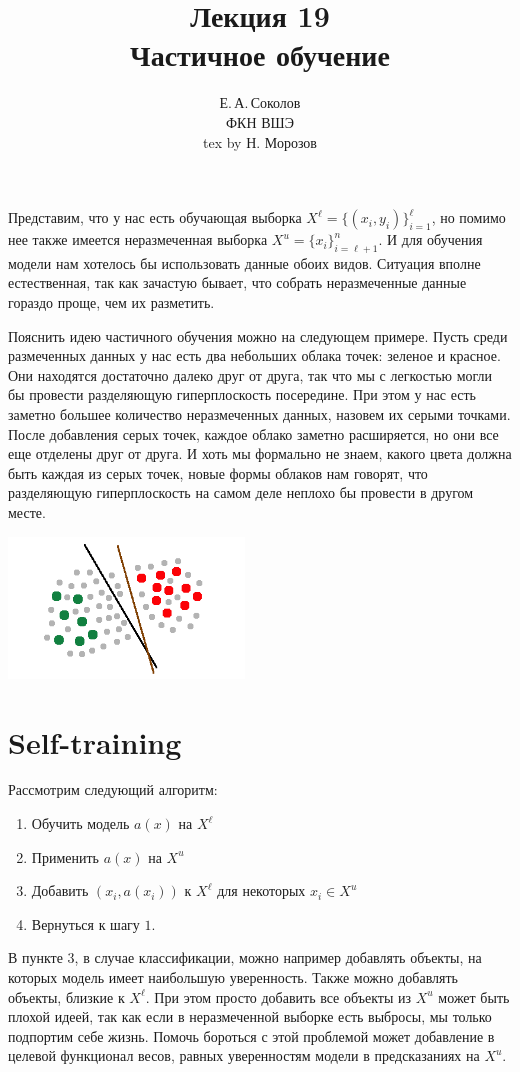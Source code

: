 \documentclass[12pt,fleqn]{article}
\begin{document}
\title{Лекция 19\\Частичное обучение}
\author{Е.\,А.\,Соколов\\ФКН ВШЭ\\\normalsize{tex by Н. Морозов}}
\maketitle

Представим, что у нас есть обучающая выборка $X^\ell = \{(x_i, y_i)\}_{i = 1}^{\ell}$, но помимо нее также имеется неразмеченная выборка $X^u = \{x_i\}_{i = \ell + 1}^{n}$. И для обучения модели нам хотелось бы использовать данные обоих видов. Ситуация вполне естественная, так как зачастую бывает, что собрать неразмеченные данные гораздо проще, чем их разметить.

Пояснить идею частичного обучения можно на следующем примере. Пусть среди размеченных данных у нас есть два небольших облака точек: зеленое и красное. Они находятся достаточно далеко друг от друга, так что мы с легкостью могли бы провести разделяющую гиперплоскость посередине. При этом у нас есть заметно большее количество неразмеченных данных, назовем их серыми точками. После добавления серых точек, каждое облако заметно расширяется, но они все еще отделены друг от друга. И хоть мы формально не знаем, какого цвета должна быть каждая из серых точек, новые формы облаков нам говорят, что разделяющую гиперплоскость на самом деле неплохо бы провести в другом месте.

\begin{center}
    \includegraphics[width=0.47\textwidth]{semi-supervised_example.png}
\end{center}

\section{Self-training}

Рассмотрим следующий алгоритм:
\begin{enumerate}
    \item Обучить модель $a(x)$ на $X^\ell$
    \item Применить $a(x)$ на $X^u$
    \item Добавить $(x_i, a(x_i))$ к $X^\ell$ для некоторых $x_i \in X^u$
    \item Вернуться к шагу $1.$
\end{enumerate}
В пункте 3, в случае классификации, можно например добавлять объекты, на которых модель имеет наибольшую уверенность. Также можно добавлять объекты, близкие к $X^\ell$. При этом просто добавить все объекты из $X^u$ может быть плохой идеей, так как если в неразмеченной выборке есть выбросы, мы только подпортим себе жизнь. Помочь бороться с этой проблемой может добавление в целевой функционал весов, равных уверенностям модели в предсказаниях на $X^u$.
\end{document}
